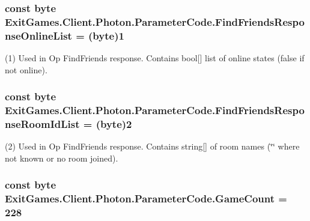 \subsubsection[{\texorpdfstring{Find\+Friends\+Response\+Online\+List}{FindFriendsResponseOnlineList}}]{\setlength{\rightskip}{0pt plus 5cm}const byte Exit\+Games.\+Client.\+Photon.\+Parameter\+Code.\+Find\+Friends\+Response\+Online\+List = (byte)1}\hypertarget{class_exit_games_1_1_client_1_1_photon_1_1_parameter_code_af6846009bdef571db627b0944560166b}{}\label{class_exit_games_1_1_client_1_1_photon_1_1_parameter_code_af6846009bdef571db627b0944560166b}


(1) Used in Op Find\+Friends response. Contains bool\mbox{[}\mbox{]} list of online states (false if not online).

\subsubsection[{\texorpdfstring{Find\+Friends\+Response\+Room\+Id\+List}{FindFriendsResponseRoomIdList}}]{\setlength{\rightskip}{0pt plus 5cm}const byte Exit\+Games.\+Client.\+Photon.\+Parameter\+Code.\+Find\+Friends\+Response\+Room\+Id\+List = (byte)2}\hypertarget{class_exit_games_1_1_client_1_1_photon_1_1_parameter_code_ac902f48f2bf554c848ddf4da57b8c828}{}\label{class_exit_games_1_1_client_1_1_photon_1_1_parameter_code_ac902f48f2bf554c848ddf4da57b8c828}


(2) Used in Op Find\+Friends response. Contains string\mbox{[}\mbox{]} of room names (\char`\"{}\char`\"{} where not known or no room joined).

\subsubsection[{\texorpdfstring{Game\+Count}{GameCount}}]{\setlength{\rightskip}{0pt plus 5cm}const byte Exit\+Games.\+Client.\+Photon.\+Parameter\+Code.\+Game\+Count = 228}\hypertarget{class_exit_games_1_1_client_1_1_photon_1_1_parameter_code_af1c484be2b1e6474d46204e7cc7b6fde}{}\label{class_exit_games_1_1_client_1_1_photon_1_1_parameter_code_af1c484be2b1e6474d46204e7cc7b6fde}


